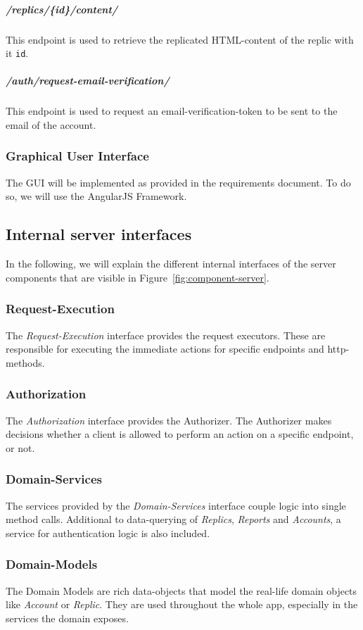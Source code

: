 \subparagraph{/replics/\{id\}/content/} This endpoint is used to retrieve the replicated HTML-content of the replic with it \texttt{id}.

\subparagraph{/auth/request-email-verification/} This endpoint is used to request an email-verification-token to be sent to the email of the account.

\subsubsection{Graphical User Interface}
The GUI will be implemented as provided in the requirements document.
To do so, we will use the AngularJS Framework.

\subsection{Internal server interfaces}\label{subsec:internal-server-interfaces}
In the following, we will explain the different internal interfaces of the server components that are visible in Figure~\ref{fig:component-server}.

\subsubsection{Request-Execution}
The \textit{Request-Execution} interface provides the request executors.
These are responsible for executing the immediate actions for specific endpoints and http-methods.

\subsubsection{Authorization}
The \textit{Authorization} interface provides the Authorizer.
The Authorizer makes decisions whether a client is allowed to perform an action on a specific endpoint, or not.

\subsubsection{Domain-Services}
The services provided by the \textit{Domain-Services} interface couple logic into single method calls.
Additional to data-querying of \textit{Replics}, \textit{Reports} and \textit{Accounts}, a service for authentication logic is also included.

\subsubsection{Domain-Models}
The Domain Models are rich data-objects that model the real-life domain objects like \textit{Account} or \textit{Replic}.
They are used throughout the whole app, especially in the services the domain exposes.

